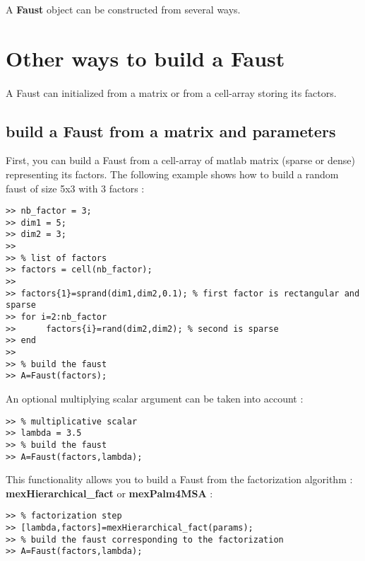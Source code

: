 A \textbf{Faust} object can be constructed from several ways.

\section{Other ways to build a Faust}\label{sec:firstUseBuildFromCellArray}
\paragraph{} A Faust can initialized from a matrix or from a cell-array storing its factors.

\subsection{build a Faust from a matrix and parameters}\label{sec:firstUseBuildFromMatrix}
First, you can build a Faust from a cell-array of matlab matrix (sparse or dense) representing its factors.
\newline
\newline
The following example shows how to build a random faust of size 5x3 with 3 factors :

\begin{lstlisting}
>> nb_factor = 3;
>> dim1 = 5;
>> dim2 = 3; 
>>
>> % list of factors
>> factors = cell(nb_factor);
>>
>> factors{1}=sprand(dim1,dim2,0.1); % first factor is rectangular and sparse 
>> for i=2:nb_factor
>> 		factors{i}=rand(dim2,dim2); % second is sparse
>> end
>>
>> % build the faust
>> A=Faust(factors);
\end{lstlisting}
\newpage

An optional multiplying scalar argument can be taken into account  :
\begin{lstlisting}
>> % multiplicative scalar
>> lambda = 3.5 
>> % build the faust
>> A=Faust(factors,lambda);
\end{lstlisting}

This functionality allows you to build a Faust from the factorization algorithm :
\textbf{mexHierarchical{\_}fact} or \textbf{mexPalm4MSA} :
\begin{lstlisting}
>> % factorization step
>> [lambda,factors]=mexHierarchical_fact(params);
>> % build the faust corresponding to the factorization
>> A=Faust(factors,lambda);
\end{lstlisting}


 
